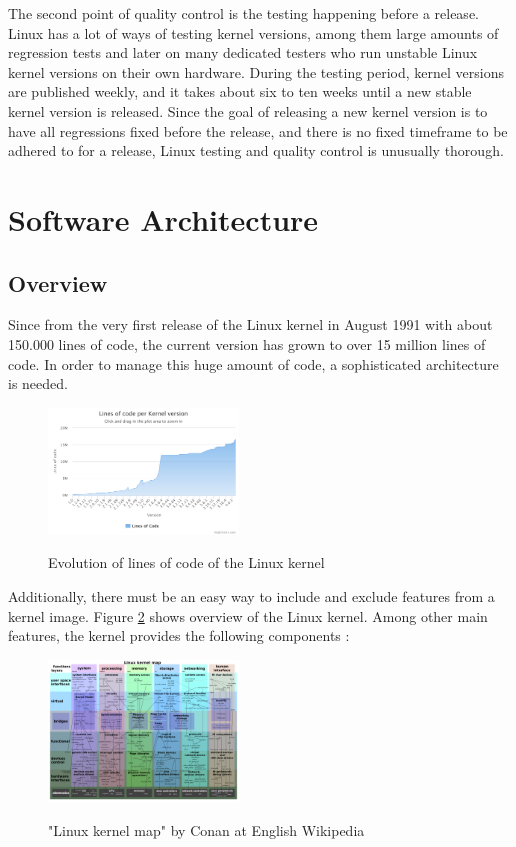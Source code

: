 \documentclass{sig-alternate-05-2015}
\begin{document}
The second point of quality control is the testing happening before a release.
Linux has a lot of ways of testing kernel versions, among them large amounts of regression tests and later on many dedicated testers who run unstable Linux kernel versions on their own hardware.
During the testing period, kernel versions are published weekly, and it takes about six to ten weeks until a new stable kernel version is released.
Since the goal of releasing a new kernel version is to have all regressions fixed before the release, and there is no fixed timeframe to be adhered to for a release, Linux testing and quality control is unusually thorough.


\section{Software Architecture}
\subsection{Overview}
Since from the very first release of the Linux kernel in August 1991 \cite{linuxtimeline} with about 150.000 lines of code, the current version has grown to over 15 million lines of code. In order to manage this huge amount of code, a sophisticated architecture is needed.
\begin{figure}[h]
\centering
\includegraphics[width= 0.45\textwidth ]{img/chart.pdf}
\label{kconfig-compil}
\caption{Evolution of lines of code of the Linux kernel \cite{linuxcounter}}
\end{figure}

Additionally, there must be an easy way to include and exclude features from a kernel image. 
Figure \ref{fig:kernelmap} shows overview of the Linux kernel. Among other main features, the kernel provides the following  components \cite{mauerer2010professional}:
\begin{figure}[h]
\centering
\includegraphics[width= 0.45\textwidth ]{img/Linux_kernel_map.png}
\label{fig:kernelmap}
\caption{"Linux kernel map" by Conan at English Wikipedia \cite{kernelmap}}
\end{figure}
\end{document}
